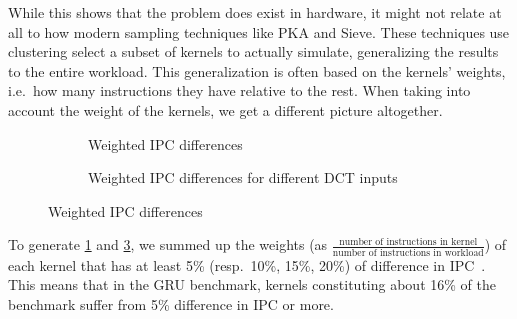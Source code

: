 While this shows that the problem does exist in hardware, it might not relate at all to how modern sampling techniques like PKA\cite{pks} and Sieve\cite{sieve}.
These techniques use clustering select a subset of kernels to actually simulate, generalizing the results to the entire workload.
This generalization is often based on the kernels' weights, i.e.\ how many instructions they have relative to the rest.
When taking into account the weight of the kernels, we get a different picture altogether.

\begin{figure}
    \centering
    \begin{subfigure}{\textwidth}
        \begin{minipage}[c]{0.45\textwidth}
            \resizebox{\textwidth}{!}{}
        \end{minipage}
        \begin{minipage}[c]{0.45\textwidth}
            \resizebox{\textwidth}{!}{}
        \end{minipage}
        \caption{Weighted IPC differences}
        \label{fig:weight_ipc_diff}
    \end{subfigure}
    \centering
    \begin{subfigure}{\textwidth}
        \begin{minipage}[c]{0.45\textwidth}
            \resizebox{\textwidth}{!}{}
        \end{minipage}
        \begin{minipage}[c]{0.45\textwidth}
            \resizebox{\textwidth}{!}{}
        \end{minipage}
        \caption{Weighted IPC differences for different DCT inputs}
        \label{fig:weight_ipc_dct}
    \end{subfigure}
    \caption{Weighted IPC differences}
\end{figure}

To generate \cref{fig:weight_ipc_diff} and \cref{fig:weight_ipc_dct}, we summed up the weights (as $\frac{\text{number of instructions in kernel}}{\text{number of instructions in workload}}$) of each kernel that has at least 5\% (resp.\ 10\%, 15\%, 20\%) of difference in IPC\ .
This means that in the GRU benchmark, kernels constituting about 16\% of the benchmark suffer from 5\% difference in IPC or more.

\FloatBarrier